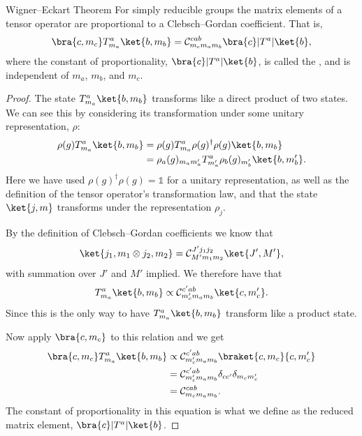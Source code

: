 \documentclass[fleqn]{NotesClass}
\newcommand*{\hermit}{\dagger}
\newcommand*{\ident}{\mathbb{1}}
\newcommand*{\directproduct}{\otimes}
\newcommand*{\clebschgordan}[6]{\mathcal{C}_{#1#2#3}^{#4#5#6}}
\begin{document}
    \begin{thm}{Wigner--Eckart Theorem}{}
        For simply reducible groups the matrix elements of a tensor operator are proportional to a Clebsch--Gordan coefficient.
        That is,
        \begin{equation}
            \bra{c, m_c} T_{m_a}^a\ket{b, m_b} = \clebschgordan{m_c}{m_a}{m_b}{c}{a}{b} \bra{c} |T^a| \ket{b},
        \end{equation}
        where the constant of proportionality, \(\bra{c} |T^a| \ket{b}\), is called the , and is independent of \(m_a\), \(m_b\), and \(m_c\).
        
        \begin{proof}
            The state \(T^a_{m_a}\ket{b, m_b}\) transforms like a direct product of two states.
            We can see this by considering its transformation under some unitary representation, \(\rho\):
            \begin{align}
                \rho(g) T^a_{m_a} \ket{b, m_b} &= \rho(g) T^{a}_{m_a} \rho(g)^\hermit \rho(g) \ket{b, m_b}\\
                &= \rho_a(g)_{m_am_a'}T^a_{m_a'} \rho_b(g)_{m_b'}\ket{b, m_b'}.
            \end{align}
            Here we have used \(\rho(g)^\hermit\rho(g) = \ident\) for a unitary representation, as well as the definition of the tensor operator's transformation law, and that the state \(\ket{j, m}\) transforms under the representation \(\rho_j\).
            
            By the definition of Clebsch--Gordan coefficients we know that
            \begin{equation}
                \ket{j_1, m_1 \directproduct j_2, m_2} = \clebschgordan{M'}{m_1}{m_2}{J'}{j_1}{j_2}\ket{J', M'},
            \end{equation}
            with summation over \(J'\) and \(M'\) implied.
            We therefore have that
            \begin{equation}
                T_{m_a}^{a}\ket{b, m_b} \propto \clebschgordan{m_c'}{m_a}{m_b}{c'}{a}{b}\ket{c, m_c'}.
            \end{equation}
            Since this is the only way to have \(T_{m_a}^a\ket{b, m_b}\) transform like a product state.
            
            Now apply \(\bra{c, m_c}\) to this relation and we get
            \begin{align}
                \bra{c, m_c}T_{m_a}^{a}\ket{b, m_b} &\propto \clebschgordan{m_c'}{m_a}{m_b}{c'}{a}{b} \braket{c, m_c}{c, m_c'}\\
                &= \clebschgordan{m_c'}{m_a}{m_b}{c'}{a}{b} \delta_{cc'}\delta_{m_cm_c'}\\
                &= \clebschgordan{m_c}{m_a}{m_b}{c}{a}{b}.
            \end{align}
            The constant of proportionality in this equation is what we define as the reduced matrix element, \(\bra{c}|T^a|\ket{b}\).
        \end{proof}
    \end{thm}
    
\end{document}
